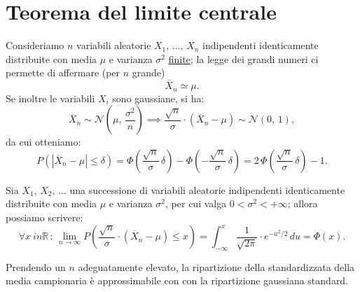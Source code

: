    \section{Teorema del limite centrale} 
        \begin{obsv}
            Consideriamo $n$ variabili aleatorie $X_1,\, \ldots,\, X_{n}$ indipendenti identicamente distribuite con media $\mu$ e varianza $\sigma^2$ \underline{finite}; la legge dei grandi numeri ci permette di affermare (per $n$ grande) \[
            \overline{X}_n \simeq \mu
            .\] Se inoltre le variabili $X_i$ sono gaussiane, si ha: \[
            \overline{X}_n \sim \mathcal{N}\left(\mu,\,\frac{\sigma^2}{n}\right) \implies
                \frac{\sqrt{n}}{\sigma} \cdot (\overline{X}_n - \mu) \sim \mathcal{N}(0,\,1) 
            ,\] da cui otteniamo: \[
            P\left(|\overline{X}_n - \mu| \leq \delta\right) = 
            \Phi\left(\frac{\sqrt{n}}{\sigma}\,\delta\right) - 
            \Phi\left(-\frac{\sqrt{n}}{\sigma}\,\delta\right) =
            2\, \Phi\left(\frac{\sqrt{n}}{\sigma}\,\delta\right) - 1
            .\]
        \end{obsv}
        \begin{thm}
            Sia $X_1,\, X_2,\, \ldots$ una successione di variabili aleatorie indipendenti identicamente distribuite con media $\mu$ e varianza $\sigma^2$, per cui valga $0 < \sigma^2 < +\infty$; allora possiamo scrivere:
            \begin{equation}\label{eq:Teorema_limite_centrale}
                \forall x\ in \mathbb{R} \,:\, \lim_{n \to \infty} P\left(\frac{\sqrt{n}}{\sigma} \cdot (\overline{X}_n - \mu) \leq x\right) = \int_{-\infty}^{x} \frac{1}{\sqrt{2\pi}}\cdot e^{-u^2 /2}\, du = \Phi(x)
            .\end{equation}
        \end{thm}
        \begin{obsv}
            Prendendo un $n$ adeguatamente elevato, la ripartizione della standardizzata della media campionaria è approssimabile con con la ripartizione gaussiana standard.
        \end{obsv}
